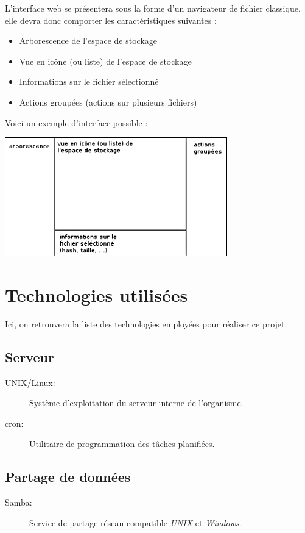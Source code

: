 L'interface web se présentera sous la forme d'un navigateur de fichier classique, elle devra donc
comporter les caractéristiques suivantes :

\begin{itemize}
     \item Arborescence de l'espace de stockage
     \item Vue en icône (ou liste) de l'espace de stockage
     \item Informations sur le fichier sélectionné
     \item Actions groupées (actions sur plusieurs fichiers)
\end{itemize}

Voici un exemple d'interface possible :

\includegraphics{img/schema02.png}

\section{Technologies utilisées}

Ici, on retrouvera la liste des technologies employées pour réaliser ce projet.

\subsection{Serveur}

\begin{description}
     \item[UNIX/Linux:] Système d'exploitation du serveur interne de l'organisme.
     \item[cron:] Utilitaire de programmation des tâches planifiées.
\end{description}

\subsection{Partage de données}

\begin{description}
     \item[Samba:] Service de partage réseau compatible \textit{UNIX} et \textit{Windows}.
\end{description}

